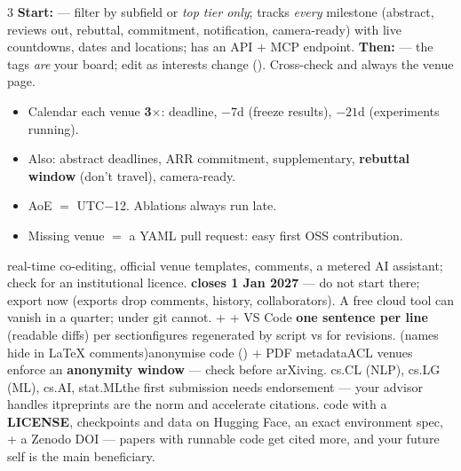 \documentclass[10pt,a4paper]{article}
\begin{document}
\begin{multicols}{3}
\textbf{Start:} 
--- filter by subfield or \emph{top tier only}; tracks
\emph{every} milestone (abstract, reviews out, rebuttal, commitment,
notification, camera-ready) with live countdowns, dates and locations; has an
API + MCP endpoint.
\textbf{Then:} 
--- the  tags \emph{are} your board; edit as interests change
().
Cross-check  and always the venue page.
\begin{itemize}
  \item Calendar each venue \textbf{3$\times$}: deadline, $-7$d (freeze
        results), $-21$d (experiments running).
  \item Also: abstract deadlines, ARR commitment, supplementary,
        \textbf{rebuttal window} (don't travel), camera-ready.
  \item AoE $=$ UTC$-$12. Ablations always run late.
  \item Missing venue $=$ a YAML pull request: easy first OSS contribution.
\end{itemize}

real-time co-editing, official
venue templates, comments, a metered AI assistant; check for an institutional
licence.
\textbf{closes 1 Jan 2027} --- do
not start there; export now (exports drop comments, history, collaborators).
A free cloud tool can vanish in a quarter;  under git cannot.
 +  + VS Code\dt
\textbf{one sentence per line} (readable diffs)\dt {}
per section\dt figures regenerated by script\dt {} vs
\dt {} for revisions.
(names hide in LaTeX comments)\dt anonymise code
() + PDF
metadata\dt ACL venues enforce an \textbf{anonymity window} --- check before
arXiving.
cs.CL (NLP), cs.LG (ML), cs.AI, stat.ML\dt the first submission
needs endorsement --- your advisor handles it\dt preprints are the norm and
accelerate citations.
code with a \textbf{LICENSE}, checkpoints and data on Hugging
Face, an exact environment spec,  + a Zenodo DOI ---
papers with runnable code get cited more, and your future self is the main
beneficiary.


\end{multicols}
\end{document}
